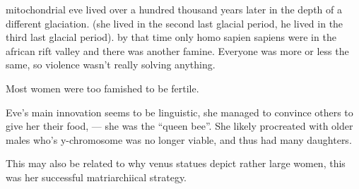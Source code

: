 \documentclass{report}
\begin{document}
mitochondrial eve lived over a hundred thousand years later in the depth of a different glaciation. (she lived in the second last glacial period, he lived in the third last glacial period).
by that time only homo sapien sapiens were in the african rift valley and there was another famine. Everyone was more or less the same, so violence wasn't really solving anything.

Most women were too famished to be fertile.

Eve's main innovation seems to be linguistic, she managed to convince others to
give her their food, --- she was the ``queen bee''. She likely procreated with 
older males who's y-chromosome was no longer viable, and thus had many daughters.

This may also be related to why venus statues depict rather large women, this was her successful matriarchiical strategy.
	
\end{document}
